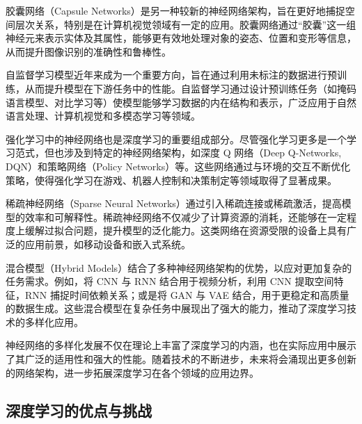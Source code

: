 胶囊网络（Capsule Networks）是另一种较新的神经网络架构，旨在更好地捕捉空间层次关系，特别是在计算机视觉领域有一定的应用。胶囊网络通过“胶囊”这一组神经元来表示实体及其属性，能够更有效地处理对象的姿态、位置和变形等信息，从而提升图像识别的准确性和鲁棒性。

自监督学习模型近年来成为一个重要方向，旨在通过利用未标注的数据进行预训练，从而提升模型在下游任务中的性能。自监督学习通过设计预训练任务（如掩码语言模型、对比学习等）使模型能够学习数据的内在结构和表示，广泛应用于自然语言处理、计算机视觉和多模态学习等领域。

强化学习中的神经网络也是深度学习的重要组成部分。尽管强化学习更多是一个学习范式，但也涉及到特定的神经网络架构，如深度 Q 网络（Deep Q-Networks, DQN）和策略网络（Policy Networks）等。这些网络通过与环境的交互不断优化策略，使得强化学习在游戏、机器人控制和决策制定等领域取得了显著成果。

稀疏神经网络（Sparse Neural Networks）通过引入稀疏连接或稀疏激活，提高模型的效率和可解释性。稀疏神经网络不仅减少了计算资源的消耗，还能够在一定程度上缓解过拟合问题，提升模型的泛化能力。这类网络在资源受限的设备上具有广泛的应用前景，如移动设备和嵌入式系统。

混合模型（Hybrid Models）结合了多种神经网络架构的优势，以应对更加复杂的任务需求。例如，将 CNN 与 RNN 结合用于视频分析，利用 CNN 提取空间特征，RNN 捕捉时间依赖关系；或是将 GAN 与 VAE 结合，用于更稳定和高质量的数据生成。这些混合模型在复杂任务中展现出了强大的能力，推动了深度学习技术的多样化应用。

神经网络的多样化发展不仅在理论上丰富了深度学习的内涵，也在实际应用中展示了其广泛的适用性和强大的性能。随着技术的不断进步，未来将会涌现出更多创新的网络架构，进一步拓展深度学习在各个领域的应用边界。



\subsection{深度学习的优点与挑战}

